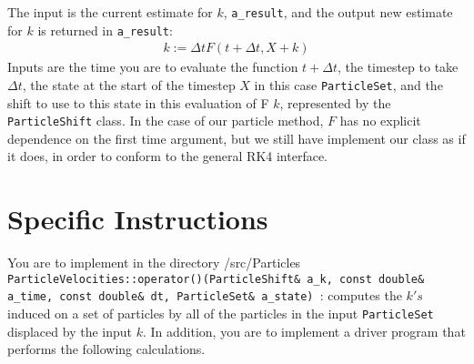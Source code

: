 \documentclass[11pt]{article}
\begin{document}
The input is the current estimate for $k$, {\tt a\_result}, and the output new estimate for $k$ is returned in {\tt a\_result}:
\begin{gather*}
    k := \Delta t F(t + \Delta t,X + k)
\end{gather*}
Inputs are the time you are to evaluate the function $t+\Delta t$, the timestep to take $\Delta t$, the state at the start of the timestep $X$ in this case {\tt ParticleSet}, and the shift to use to this state in this evaluation of F $k$, represented by the {\tt ParticleShift} class. In the case of our particle method, $F$ has no explicit dependence on the first time argument, but we still have implement our class as if it does, in order to conform to the general RK4 interface.

\section*{Specific Instructions }
You are to implement in the directory /src/Particles
{\tt ParticleVelocities::operator()(ParticleShift\& a\_k, const double\& a\_time, const double\& dt, ParticleSet\& a\_state) }: computes the $k's$ induced on a set of particles by all of the particles in the input {\tt ParticleSet} displaced by the input $k$.
In addition, you are to implement a driver program that performs the following calculations.
\end{document}
